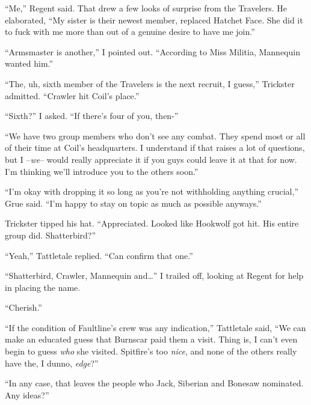 ``Me,'' Regent said.  That drew a few looks of surprise from the Travelers.  He elaborated, ``My sister is their newest member, replaced Hatchet Face.  She did it to fuck with me more than out of a genuine desire to have me join.''



``Armsmaster is another,'' I pointed out.  ``According to Miss Militia, Mannequin wanted him.''



``The, uh, sixth member of the Travelers is the next recruit, I guess,'' Trickster admitted.  ``Crawler hit Coil's place.''



``Sixth?'' I asked.  ``If there's four of you, then-''



``We have two group members who don't see any combat.  They spend most or all of their time at Coil's headquarters.  I understand if that raises a lot of questions, but I –\emph{we}– would really appreciate it if you guys could leave it at that for now.  I'm thinking we'll introduce you to the others soon.''



``I'm okay with dropping it so long as you're not withholding anything crucial,'' Grue said.  ``I'm happy to stay on topic as much as possible anyways.''



Trickster tipped his hat.  ``Appreciated.  Looked like Hookwolf got hit.  His entire group did.  Shatterbird?''



``Yeah,'' Tattletale replied.  ``Can confirm that one.''



``Shatterbird, Crawler, Mannequin and\ldots'' I trailed off, looking at Regent for help in placing the name.



``Cherish.''



``If the condition of Faultline's crew was any indication,'' Tattletale said, ``We can make an educated guess that Burnscar paid them a visit.  Thing is, I can't even begin to guess \emph{who} she visited.  Spitfire's too \emph{nice}, and none of the others really have the, I dunno, \emph{edge}?''



``In any case, that leaves the people who Jack, Siberian and Bonesaw nominated.  Any ideas?''



